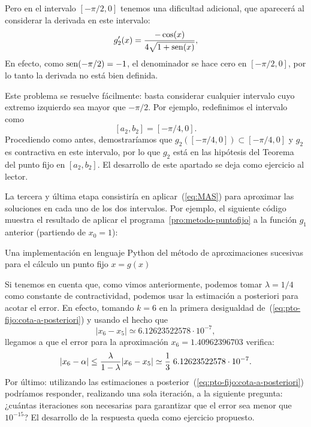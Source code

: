 \begin{example}
\begin{itemize}
    Pero en el intervalo $[-\pi/2,0]$ tenemos una dificultad
    adicional, que aparecerá al considerar la derivada en este
    intervalo:
    $$
    g_2'(x)=\frac{-\cos(x)}{4\sqrt{1+\operatorname{sen}(x)}},
    $$
    En efecto, como $\operatorname{sen}(-\pi/2)=-1$, el denominador se hace cero en
    $[-\pi/2,0]$, por lo tanto la derivada no está bien definida.

    Este problema se resuelve fácilmente: basta considerar cualquier
    intervalo cuyo extremo izquierdo sea mayor que $-\pi/2$. Por
    ejemplo, redefinimos el intervalo como
    $$[a_2,b_2]=[-\pi/4,0].$$
    Procediendo como antes, demostraríamos que
    $g_2([-\pi/4,0])\subset[-\pi/4,0]$ y $g_2$ es contractiva en este
    intervalo, por lo que $g_2$ está en las hipótesis del Teorema del
    punto fijo en $[a_2,b_2]$. El desarrollo de este apartado se deja
    como ejercicio al lector.
  \end{itemize}
  La \textsf{tercera y última etapa} consistiría en
  aplicar~(\ref{eq:MAS}) para aproximar las soluciones en cada uno de
  los dos intervalos. Por ejemplo, el siguiente código muestra el
  resultado de aplicar el programa~\ref{pro:metodo-puntofijo}
  a la función $g_1$ anterior (partiendo de $x_0=1$):
  \begin{pythonoutput}
  \end{pythonoutput}
  \label{ex:punto-fijo-1}
  \begin{program}
    \caption{Una implementación en lenguaje Python del método de
      aproximaciones sucesivas para el cálculo un punto fijo $x=g(x)$}
    \label{pro:metodo-puntofijo}
  \end{program}

  Si tenemos en cuenta que, como vimos anteriormente, podemos tomar
  $\lambda=1/4$ como constante de contractividad, podemos usar la
  estimación a posteriori para acotar el error. En efecto, tomando
  $k=6$ en la primera desigualdad
  de~(\ref{eq:pto-fijo:cota-a-posteriori}) y usando el hecho que
  $$
  |x_{6}-x_{5}| \simeq 6.12623522578 \cdot 10^{-7},
  $$
  llegamos a que el error para la aproximación $x_6=1.40962396703$ verifica:
  $$
  |x_6-\alpha| \le \frac{\lambda}{1-\lambda}
  |x_6-x_{5}|
  \simeq \frac{1}{3}\; 6.12623522578 \cdot 10^{-7}.
  $$
  Por último: utilizando las estimaciones a
  posterior~(\ref{eq:pto-fijo:cota-a-posteriori}) podríamos responder,
  realizando una sola iteración, a la siguiente pregunta: ¿cuántas
  iteraciones son necesarias para garantizar que el error sea menor que
  $10^{-15}$? El desarrollo de la respuesta queda como ejercicio
  propuesto.
\end{example}


